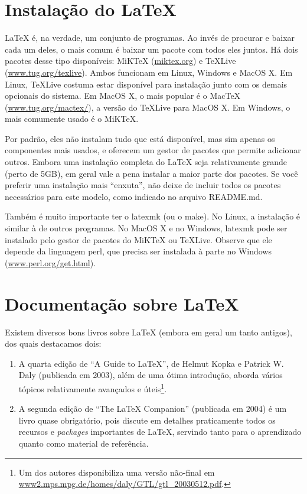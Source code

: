 \section{Instalação do \LaTeX{}}
\label{sec:install}

\enlargethispage{-.5\baselineskip}

\LaTeX{} é, na verdade, um conjunto de programas. Ao invés de procurar e
baixar cada um deles, o mais comum é baixar um pacote com todos eles juntos.
Há dois pacotes desse tipo disponíveis: MiK\TeX{} (\url{miktex.org}) e
\TeX{}Live (\url{www.tug.org/texlive}). Ambos funcionam em Linux, Windows e
MacOS X. Em Linux, \TeX{}Live costuma estar disponível para instalação junto
com os demais opcionais do sistema. Em MacOS X, o mais popular é o Mac\TeX{}
(\url{www.tug.org/mactex/}), a versão do \TeX{}Live para MacOS X.  Em Windows,
o mais comumente usado é o MiK\TeX{}.

Por padrão, eles não instalam tudo que está disponível, mas sim apenas os
componentes mais usados, e oferecem um gestor de pacotes que permite adicionar
outros. Embora uma instalação completa do \LaTeX{} seja relativamente grande
(perto de 5GB), em geral vale a pena instalar a maior parte dos pacotes. Se
você preferir uma instalação mais ``enxuta'', não deixe de incluir todos os
pacotes necessários para este modelo, como indicado no arquivo README.md.

Também é muito importante ter o \textsf{latexmk} (ou o \textsf{make}). No Linux,
a instalação é similar à de outros programas. No MacOS X e no Windows,
\textsf{latexmk} pode ser instalado pelo gestor de pacotes do MiK\TeX{} ou
\TeX{}Live. Observe que ele depende da linguagem \textsf{perl}, que precisa ser
instalada à parte no Windows (\url{www.perl.org/get.html}).

\section{Documentação sobre \LaTeX}
\label{sec:docs}

Existem diversos bons livros sobre \LaTeX{} (embora em geral um tanto
antigos), dos quais destacamos dois:

\begin{enumerate}

  \item A quarta edição de ``A Guide to \LaTeX'', de Helmut Kopka e
        Patrick W. Daly (publicada em 2003), além de uma ótima
        introdução, aborda vários tópicos relativamente avançados e
        úteis\footnote{Um dos autores disponibiliza uma versão não-final
        em \url{www2.mps.mpg.de/homes/daly/GTL/gtl_20030512.pdf}.}.
  \item A segunda edição de ``The \LaTeX{} Companion'' (publicada em
        2004) é um livro quase obrigatório, pois discute em detalhes
        praticamente todos os recursos e \textit{packages} importantes
        de \LaTeX{}, servindo tanto para o aprendizado quanto como
        material de referência.

\end{enumerate}

